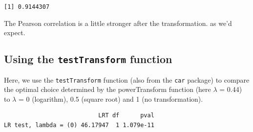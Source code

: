 \documentclass[
]{book}
\newenvironment{Shaded}{\begin{snugshade}}{\end{snugshade}}
\newcommand{\DecValTok}[1]{\textcolor[rgb]{0.00,0.00,0.81}{#1}}
\newcommand{\FloatTok}[1]{\textcolor[rgb]{0.00,0.00,0.81}{#1}}
\newcommand{\KeywordTok}[1]{\textcolor[rgb]{0.13,0.29,0.53}{\textbf{#1}}}
\newcommand{\NormalTok}[1]{#1}
\newcommand{\OperatorTok}[1]{\textcolor[rgb]{0.81,0.36,0.00}{\textbf{#1}}}
\newcommand{\StringTok}[1]{\textcolor[rgb]{0.31,0.60,0.02}{#1}}
\begin{document}
\begin{Shaded}
\end{Shaded}

\begin{verbatim}
[1] 0.9144307
\end{verbatim}

The Pearson correlation is a little stronger after the transformation. as we'd expect.

\hypertarget{using-the-testtransform-function}{%
\subsection{\texorpdfstring{Using the \texttt{testTransform} function}{Using the testTransform function}}\label{using-the-testtransform-function}}

Here, we use the \texttt{testTransform} function (also from the \texttt{car} package) to compare the optimal choice determined by the powerTransform function (here \(\lambda\) = 0.44) to \(\lambda\) = 0 (logarithm), 0.5 (square root) and 1 (no transformation).

\begin{Shaded}
\end{Shaded}

\begin{verbatim}
                           LRT df      pval
LR test, lambda = (0) 46.17947  1 1.079e-11
\end{verbatim}

\begin{Shaded}
\end{Shaded}
\end{document}

